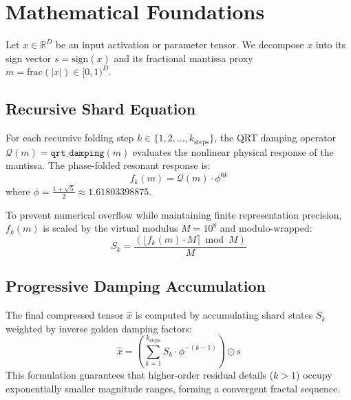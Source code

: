 \section{Mathematical Foundations}
Let $x \in \mathbb{R}^D$ be an input activation or parameter tensor. We decompose $x$ into its sign vector $s = \text{sign}(x)$ and its fractional mantissa proxy $m = \text{frac}(|x|) \in [0, 1)^D$.

\subsection{Recursive Shard Equation}
For each recursive folding step $k \in \{1, 2, \dots, k_{\text{steps}}\}$, the QRT damping operator $\mathcal{Q}(m) = \texttt{qrt\_damping}(m)$ evaluates the nonlinear physical response of the mantissa. The phase-folded resonant response is:
\begin{equation}
    f_k(m) = \mathcal{Q}(m) \cdot \phi^{6k}
\end{equation}
where $\phi = \frac{1+\sqrt{5}}{2} \approx 1.61803398875$.

To prevent numerical overflow while maintaining finite representation precision, $f_k(m)$ is scaled by the virtual modulus $M = 10^8$ and modulo-wrapped:
\begin{equation}
    S_k = \frac{\left(\lfloor f_k(m) \cdot M \rceil \bmod M\right)}{M}
\end{equation}

\subsection{Progressive Damping Accumulation}
The final compressed tensor $\hat{x}$ is computed by accumulating shard states $S_k$ weighted by inverse golden damping factors:
\begin{equation}
    \hat{x} = \left(\sum_{k=1}^{k_{\text{steps}}} S_k \cdot \phi^{-(k-1)}\right) \odot s
\end{equation}
This formulation guarantees that higher-order residual details ($k > 1$) occupy exponentially smaller magnitude ranges, forming a convergent fractal sequence.
